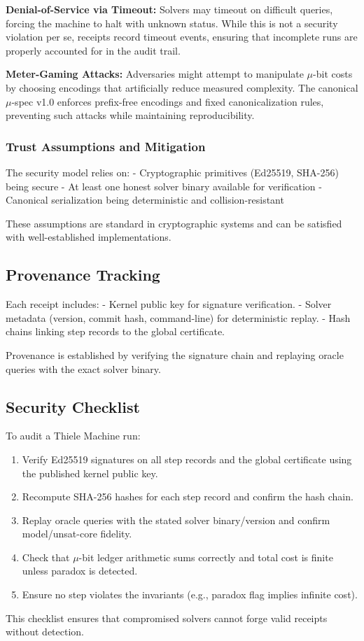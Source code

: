 \documentclass[11pt]{article}
\begin{document}
\textbf{Denial-of-Service via Timeout:} Solvers may timeout on difficult queries, forcing the machine to halt with unknown status. While this is not a security violation per se, receipts record timeout events, ensuring that incomplete runs are properly accounted for in the audit trail.

\textbf{Meter-Gaming Attacks:} Adversaries might attempt to manipulate $\mu$-bit costs by choosing encodings that artificially reduce measured complexity. The canonical $\mu$-spec v1.0 enforces prefix-free encodings and fixed canonicalization rules, preventing such attacks while maintaining reproducibility.

\subsubsection{Trust Assumptions and Mitigation}

The security model relies on:
- Cryptographic primitives (Ed25519, SHA-256) being secure
- At least one honest solver binary available for verification
- Canonical serialization being deterministic and collision-resistant

These assumptions are standard in cryptographic systems and can be satisfied with well-established implementations.

\subsection{Provenance Tracking}

Each receipt includes:
- Kernel public key for signature verification.
- Solver metadata (version, commit hash, command-line) for deterministic replay.
- Hash chains linking step records to the global certificate.

Provenance is established by verifying the signature chain and replaying oracle queries with the exact solver binary.

\subsection{Security Checklist}

To audit a Thiele Machine run:
\begin{enumerate}
  \item Verify Ed25519 signatures on all step records and the global certificate using the published kernel public key.
  \item Recompute SHA-256 hashes for each step record and confirm the hash chain.
  \item Replay oracle queries with the stated solver binary/version and confirm model/unsat-core fidelity.
  \item Check that $\mu$-bit ledger arithmetic sums correctly and total cost is finite unless paradox is detected.
  \item Ensure no step violates the invariants (e.g., paradox flag implies infinite cost).
\end{enumerate}

This checklist ensures that compromised solvers cannot forge valid receipts without detection.
\end{document}
